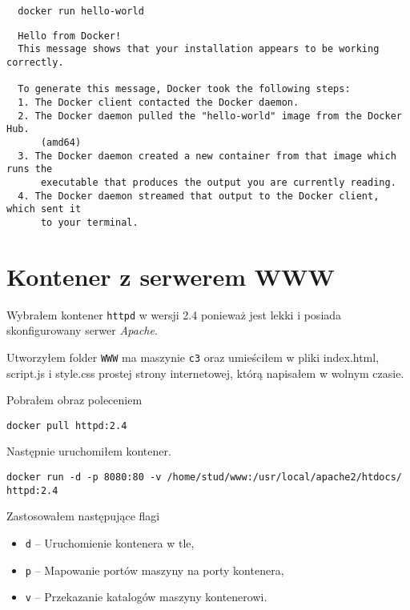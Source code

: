 \documentclass{article} %
\begin{document}
\begin{tcolorbox}[colback=yellow!10!white,colframe=red!45!black,coltitle=yellow!100!black, title=hello-world]
  \begin{lstlisting}
  docker run hello-world
  \end{lstlisting}
  \tcblower
  \scriptsize
  \begin{lstlisting}
  Hello from Docker!
  This message shows that your installation appears to be working correctly.

  To generate this message, Docker took the following steps:
  1. The Docker client contacted the Docker daemon.
  2. The Docker daemon pulled the "hello-world" image from the Docker Hub.
      (amd64)
  3. The Docker daemon created a new container from that image which runs the
      executable that produces the output you are currently reading.
  4. The Docker daemon streamed that output to the Docker client, which sent it
      to your terminal.
  \end{lstlisting}
\end{tcolorbox}
\normalsize

\section{Kontener z serwerem WWW}
Wybrałem kontener \texttt{httpd} w wersji 2.4 ponieważ jest lekki i posiada skonfigurowany serwer \textit{Apache}.

Utworzyłem folder \texttt{WWW} ma maszynie \texttt{c3} oraz umieściłem w pliki index.html, script.js i style.css prostej strony internetowej, którą napisałem w wolnym czasie.

Pobrałem obraz poleceniem
\begin{center}
  \texttt{docker pull httpd:2.4}
\end{center}
Następnie uruchomiłem kontener.
\begin{center}
  \scriptsize
  \texttt{docker run -d -p 8080:80 -v /home/stud/www:/usr/local/apache2/htdocs/ httpd:2.4}
  \normalsize
\end{center}

Zastosowałem następujące flagi
\begin{itemize}
  \item \texttt{d} -- Uruchomienie kontenera w tle,
  \item \texttt{p} -- Mapowanie portów maszyny na porty kontenera,
  \item \texttt{v} -- Przekazanie katalogów maszyny kontenerowi.
\end{itemize}
\end{document}
